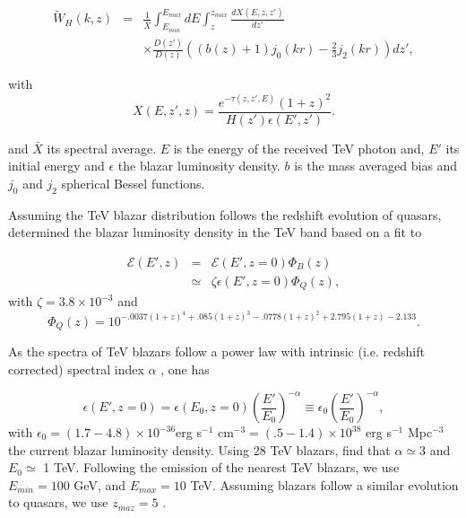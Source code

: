 \documentclass[onecolumn]{emulateapj}
\newcommand\Pc[1]{{\color{cyan} \bf #1}} %
\begin{document}
\begin{eqnarray}
  \label{eq:window}
  \tilde{W}_H(k,z)&=&\frac{1}{\bar{X}}\int_{E_{min}}^{E_{max}}dE\int_z^{z_{max}}\frac{dX(E,z,z')}{dz'} \\ 
&&\times \frac{D(z')}{D(z)}\left((b(z)+1)j_0(kr)-\frac{2}{3}j_2(kr)\right)dz', \nonumber
\end{eqnarray}

with 
 \begin{equation}
  \label{eq:define_X}
  X(E,z',z)=\frac{e^{-\tau(z,z',E)}(1+z)^2}{H(z')\epsilon(E',z')}.
\end{equation}

and $\bar{X}$ its spectral average. $E$ is the energy of the received TeV photon and, $E'$ its initial energy and  $\epsilon$ the blazar luminosity density. $b$ is the mass averaged bias and $j_0$ and $j_2$ spherical Bessel functions.


Assuming the TeV blazar distribution follows the redshift evolution of quasars, \citet{2012ApJ...752...22B} determined the blazar luminosity density in the TeV band based on a fit to \citet{2007ApJ...654..731H}

\begin{eqnarray}
  \label{eq:mean_heat}
  \mathcal{E}(E',z)&=&\mathcal{E}(E',z=0)\Phi_{B}(z)\\ \nonumber
&\simeq& \zeta\epsilon(E',z=0)\Phi_{Q}(z),
\end{eqnarray}
with $\zeta=3.8\times 10^{-3}$ and
\begin{equation}
  \label{eq:phi_quasar}
 \Phi_{Q}(z)=10^{-.0037(1+z)^4+.085(1+z)^3-.0778(1+z)^2+2.795(1+z)-2.133}. 
\end{equation}
 

As the spectra of TeV blazars follow a power law with intrinsic (i.e. redshift corrected) spectral index $\alpha$ , one has

\begin{equation}
  \label{eq:blaz_lum}
  \epsilon(E',z=0)=\epsilon(E_0,z=0)\left(\frac{E'}{E_0}\right)^{-\alpha}\equiv \epsilon_0\left(\frac{E'}{E_0}\right)^{-\alpha},
\end{equation}
with $\epsilon_0=(1.7-4.8)\times 10^{-36}$erg s$^{-1}$ cm$^{-3}=(.5-1.4)\times 10^{38}$ erg s$^{-1}$ Mpc$^{-3}$ the current blazar luminosity density. Using 28 TeV blazars, \citet{2012ApJ...752...23C} find that $\alpha\simeq 3$ and $E_0\simeq $ 1 TeV. Following the emission of the nearest TeV blazars, we use $E_{min}=100$ GeV,  and $E_{max}=10$ TeV. Assuming blazars follow a similar evolution to quasars, we use $z_{maz}=5$  \citep{2007ApJ...654..731H}.
\end{document}
